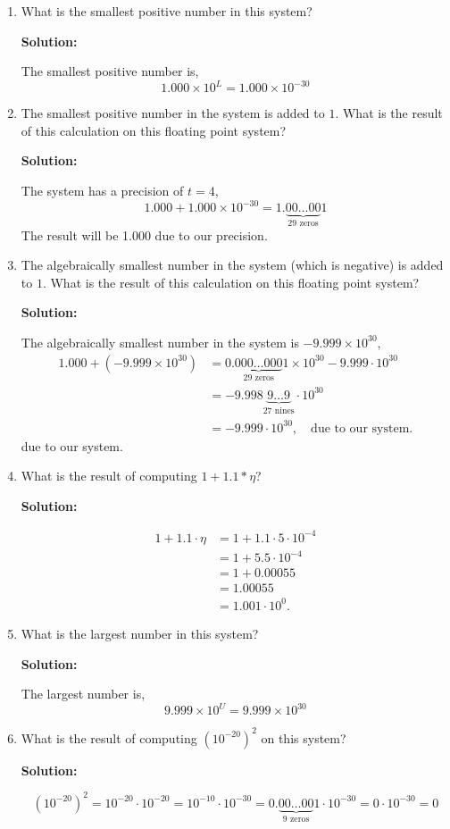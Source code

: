 \documentclass[11pt]{article}
\newenvironment{solution}
  {\par\noindent\textbf{Solution:}\par}
  {\par}
\begin{document}
\begin{enumerate}
\begin{enumerate}
\item What is the smallest positive number in this system?
  \begin{solution}
    The smallest positive number is,
    $$1.000 \times 10^L = 1.000 \times 10^{-30}$$
  \end{solution}

\item The smallest positive number in the system is added to $1$. What is the result of this calculation on this floating point system?
  \begin{solution}
  The system has a precision of $t=4$, 
  $$1.000 + 1.000 \times 10^{-30} = 1.\underbrace{00\dots 00}_{29\text{ zeros}} 1$$
  The result will be 1.000 due to our precision.
  \end{solution}


\item The algebraically smallest number in the system (which is negative) is added to $1$. What is the result of this calculation on this floating point system?
  \begin{solution}
    The algebraically smallest number in the system is $-9.999 \times 10^{30}$, 
    \begin{align*}
      1.000 + (-9.999 \times 10^{30}) &= 0.\underbrace{000\dots000}_{29\text{ zeros}}1 \times 10^{30} - 9.999 \cdot 10^{30} \\
      &= -9.998\underbrace{9\dots9}_{27 \text{ nines}} \cdot 10^{30} \\
      &= -9.999 \cdot 10^{30}, \quad \text{due to our system.}
    \end{align*}
    due to our system.
  \end{solution}


\item What is the result of computing  $1+1.1 * \eta$?
  \begin{solution}
    \begin{align*}
      1 + 1.1 \cdot \eta &= 1 + 1.1 \cdot 5 \cdot 10^{-4} \\
                        &= 1 + 5.5 \cdot 10^{-4} \\
                        &= 1 + 0.00055 \\
                        &= 1.00055 \\
                        &= 1.001 \cdot 10^0.
    \end{align*}
  \end{solution}
\item What is the largest number in this system?
  \begin{solution}
    The largest number is, 
    $$9.999 \times 10^U = 9.999 \times 10^{30}$$
  \end{solution}
\item What is the result of computing $(10^{-20})^2$ on this system?
  \begin{solution}
    $$(10^{-20})^2 = 10^{-20} \cdot 10^{-20} = 10^{-10} \cdot 10^{-30} = 0.\underbrace{00\dots00}_\text{9 zeros}1 \cdot 10^{-30} = 0 \cdot 10^{-30} = 0$$


\end{solution}
\end{enumerate}
\end{enumerate}
\end{document}
